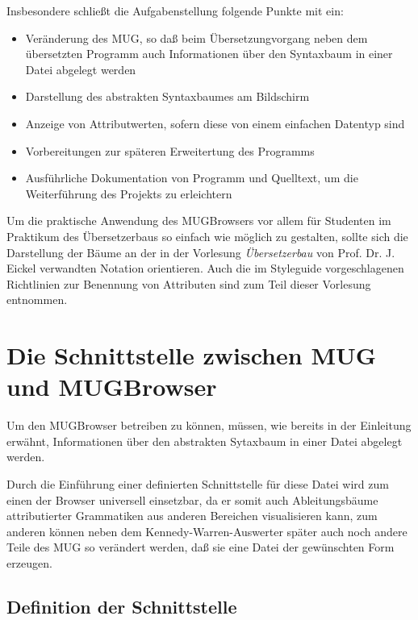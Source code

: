Insbesondere schlie\ss{}t die Aufgabenstellung folgende Punkte mit ein:
\begin{itemize}
\item{Ver\"anderung des MUG, so da\ss{} beim \"Ubersetzungvorgang neben dem \"ubersetzten Programm auch Informationen \"uber den Syntaxbaum in einer Datei
abgelegt werden}
\item{Darstellung des abstrakten Syntaxbaumes am Bildschirm}
\item{Anzeige von Attributwerten, sofern diese von einem einfachen Datentyp sind}
\item{Vorbereitungen zur sp\"ateren Erweitertung des Programms}
\item{Ausf\"uhrliche Dokumentation von Programm und Quell\-text, um die Wei\-ter\-f\"uhrung des Projekts zu erleichtern}
\end{itemize}

Um die praktische Anwendung des MUGBrowsers vor allem f\"ur Studenten im Praktikum des \"Ubersetzerbaus so einfach wie m\"oglich zu gestalten, sollte
sich die Darstellung der B\"aume an der in der Vorlesung {\it \"Ubersetzerbau} von Prof. Dr. J. Eickel verwandten Notation orientieren. Auch die im
Styleguide vorgeschlagenen Richtlinien zur Benennung von Attributen sind zum Teil dieser Vorlesung entnommen.


\pagestyle{myheadings}

\chapter{Die Schnittstelle zwischen MUG und MUGBrowser}

Um den MUGBrowser betreiben zu k\"onnen, m\"ussen, wie bereits in der Einleitung erw\"ahnt, Informationen \"uber den abstrakten Sytaxbaum in einer Datei
abgelegt werden.

Durch die Einf\"uhrung einer definierten Schnittstelle f\"ur diese Datei wird zum einen der Browser universell einsetzbar, da er somit auch
Ableitungsb\"aume attributierter Grammatiken aus anderen Bereichen visualisieren kann, zum anderen k\"onnen neben dem Kennedy-Warren-Auswerter sp\"ater
auch noch andere Teile des MUG so ver\"andert werden, da\ss{} sie eine Datei der gew\"unschten Form erzeugen.

\section{Definition der Schnittstelle}

